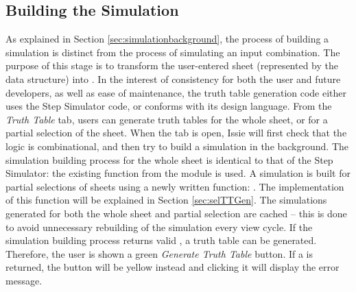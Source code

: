 \subsection{Building the Simulation}
As explained in Section \ref{sec:simulationbackground}, the process of building a simulation is distinct from the process of simulating an input combination. The purpose of this stage is to transform the user-entered sheet (represented by the  data structure) into .
In the interest of consistency for both the user and future developers, as well as ease of maintenance, the truth table generation code either uses the Step Simulator code, or conforms with its design language.
From the \textit{Truth Table} tab, users can generate truth tables for the whole sheet, or for a partial selection of the sheet. When the tab is open, Issie will first check that the logic is combinational, and then try to build a simulation in the background. The simulation building process for the whole sheet is identical to that of the Step Simulator: the existing function  from the module  is used. A simulation is built for partial selections of sheets using a newly written function: . The implementation of this function will be explained in Section \ref{sec:selTTGen}. The simulations generated for both the whole sheet and partial selection are cached -- this is done to avoid unnecessary rebuilding of the simulation every view cycle. 
If the simulation building process returns valid , a truth table can be generated. Therefore, the user is shown a green \textit{Generate Truth Table} button. If a  is returned, the button will be yellow instead and clicking it will display the error message.

